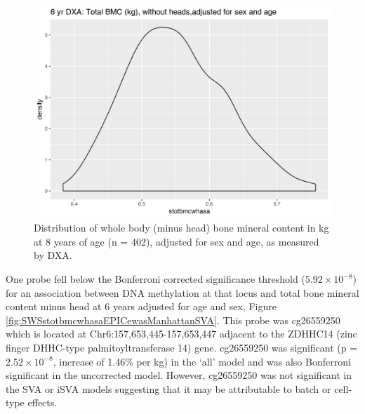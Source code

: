 \documentclass[
]{book}
\begin{document}
\begin{figure}

{\centering \includegraphics[width=0.8\linewidth]{figs/SWS6yrBMCdist} 

}

\caption{Distribution of whole body (minus head) bone mineral content in kg at 8 years of age (n = 402), adjusted for sex and age, as measured by DXA.}\label{fig:SWSstotbmcwhasa}
\end{figure}



One probe fell below the Bonferroni corrected significance threshold (\(5.92\times10^{-8}\)) for an association between DNA methylation at that locus and total bone mineral content minus head at 6 years adjusted for age and sex, Figure \ref{fig:SWSstotbmcwhasaEPICewasManhattanSVA}. This probe was cg26559250 which is located at Chr6:157,653,445-157,653,447 adjacent to the ZDHHC14 (zinc finger DHHC-type palmitoyltransferase 14) gene. cg26559250 was significant (p = \(2.52\times 10^{-8}\), increase of 1.46\% per kg) in the `all' model and was also Bonferroni significant in the uncorrected model. However, cg26559250 was not significant in the SVA or iSVA models suggesting that it may be attributable to batch or cell-type effects.
\end{document}
